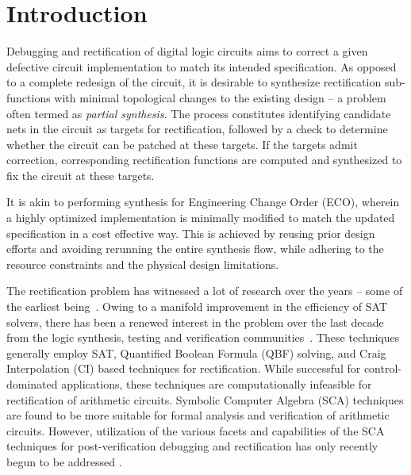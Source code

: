 \section{Introduction}
\par Debugging and rectification of digital logic circuits aims to correct
a given defective circuit implementation to match its intended
specification. {\red As opposed to a complete redesign of the circuit, it
is desirable to synthesize rectification sub-functions with
minimal topological changes to the existing design -- a problem
often termed as {\it partial synthesis}.} 
The process constitutes identifying
candidate nets in the circuit as targets for rectification, followed by  
a check to determine whether the circuit can be patched at these
targets. 
If the targets admit correction, corresponding rectification
functions are computed and synthesized to fix the circuit at these targets.
{\red  
It is akin to performing synthesis for Engineering Change Order 
(ECO), wherein a highly optimized implementation is minimally modified to match the 
updated specification in a cost effective way. This is achieved by reusing prior design 
efforts and avoiding rerunning the entire synthesis flow, while adhering to the resource 
constraints and the physical design limitations.

The rectification problem has witnessed a lot of research over the years -- 
some of the earliest being~\cite{Sadowska:DAC95,scholl:1,andreas:2005}.
Owing to a manifold improvement in the efficiency of SAT solvers,
there has been a renewed interest in the problem over the last decade from 
the logic synthesis, testing and verification communities~\cite{
MF_Huang:DATE12,scholl:2,SS_Fujita:ISQED17,SS_Alan:DAC18}.
These techniques generally employ SAT, Quantified Boolean Formula (QBF) solving,
and Craig Interpolation (CI) based techniques for rectification. While
successful for control-dominated applications, these techniques are
computationally infeasible for rectification of arithmetic circuits.
Symbolic Computer Algebra (SCA) techniques are found to be more
suitable for formal analysis and verification of arithmetic circuits.
However, utilization of the various facets and capabilities of the SCA
techniques for post-verification debugging and rectification has only
recently begun to be addressed
\cite{farimah:2017:1,MF_Rolf:ISVLSI18,Utkarsh:VLSI18,
Vkrao:FMCAD18,Utkarsh:ETS19,Vkrao:ISQED21,Vkrao:GLSVLSI21}. }


